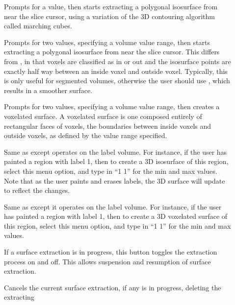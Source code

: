 \begin{description}
\item[]  Prompts for a
    value, then starts extracting a polygonal isosurface from near the slice
    cursor, using a variation of the 3D contouring algorithm called marching
    cubes.
\item[]  Prompts for two
    values, specifying a volume value range, then starts extracting a
    polygonal isosurface from near the slice
    cursor.  This differs from ,
    in that voxels are classified as in or out and the isosurface points are
    exactly half way between an inside voxel and outside voxel.  Typically,
    this is only useful for segmented volumes, otherwise the user
    should use , which
    results in a smoother surface.
\item[]  Prompts for two
    values, specifying a volume value range, then creates a voxelated
    surface.  A voxelated surface is one composed entirely of rectangular
    faces of voxels, the boundaries between inside voxels and outside
    voxels, as defined by the value range specified.
\item[]  Same as
     except operates on
    the label volume.  For instance, if the user has painted a region
    with label 1, then to create a 3D isosurface of this region, select
    this menu option, and type in ``1 1'' for the min and max values.
    Note that as the user paints and erases labels, the 3D surface will update
    to reflect the changes.
\item[]  Same as
     exc\-ept it operates on
    the label volume.  For instance, if the user has painted a region
    with label 1, then to create a 3D voxelated surface of this region,
    select this menu option, and type in ``1 1'' for the min and max values.
\item[]  If a surface extraction
    is in progress, this button toggles the extraction process on and
    off.  This allows suspension and resumption of surface extraction.
\item[]  Cancels the current
    surface extraction, if any is in progress, deleting the extracting

\end{description}
